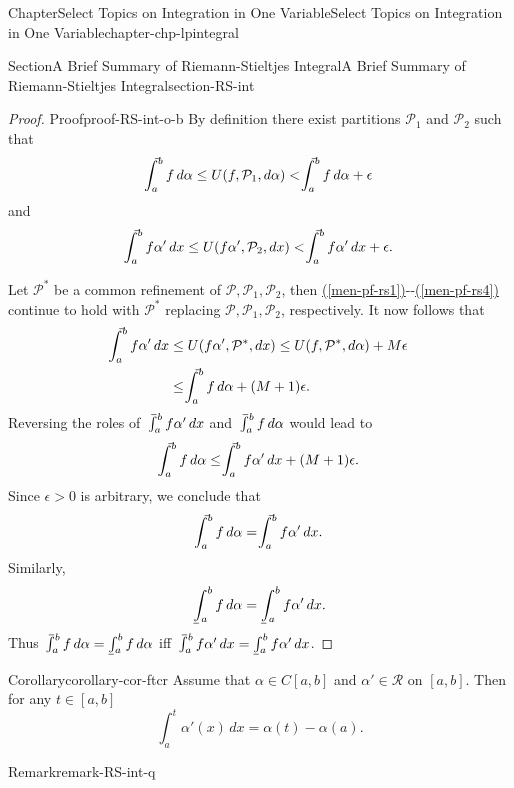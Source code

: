 \documentclass[oneside,10pt,]{book}
\makeatletter
\newcommand{\xreffont}{\relax}
\numberwithin{equation}{section}
\newcommand{\cP}{\mathcal{P}}
\newcommand{\cR}{\mathcal{R}}
\def\upint{\mathchoice
    {\mkern10mu\overline{\vphantom{\intop}\mkern7mu}\mkern-24mu}
    {\mkern7mu\overline{\vphantom{\intop}\mkern7mu}\mkern-14mu}
    {\mkern7mu\overline{\vphantom{\intop}\mkern7mu}\mkern-14mu}
    {\mkern7mu\overline{\vphantom{\intop}\mkern7mu}\mkern-14mu}
  \int}
\def\lowint{\relax\if@display
 \mkern3mu\underline{\vphantom{\intop}\mkern7mu}\mkern-10mu\int
\else 
\underline{\vphantom{\int}\mkern7mu}\mkern-10mu\int
\fi}
\newcommand{\amp}{&}
\makeatother
\begin{document}
\begin{chapterptx}{Chapter}{Select Topics on Integration in One Variable}{}{Select Topics on Integration in One Variable}{}{}{chapter-chp-lpintegral}
\begin{sectionptx}{Section}{A Brief Summary of Riemann-Stieltjes Integral}{}{A Brief Summary of Riemann-Stieltjes Integral}{}{}{section-RS-int}
\begin{proof}{Proof}{}{proof-RS-int-o-b}
By definition there exist partitions \(\cP_{1}\) and \(\cP_{2}\) such that%
\begin{equation}
\upint_{a}^{b} f \, d\alpha \le U(f, \cP_{1}, d\alpha) < \upint_{a}^{b} f \, d\alpha + \epsilon\label{men-pf-rs3}
\end{equation}
and%
\begin{equation}
\upint_{a}^{b} f \alpha' \, dx \le U(f \alpha', \cP_{2}, dx) <  \upint_{a}^{b} f \alpha' \, dx + \epsilon.\label{men-pf-rs4}
\end{equation}
%
\par
Let \(\cP^{*}\) be a common refinement of \(\cP, \cP_{1}, \cP_{2}\), then \hyperref[men-pf-rs1]{({\xreffont\ref{men-pf-rs1}})}-{}-{}\hyperref[men-pf-rs4]{({\xreffont\ref{men-pf-rs4}})} continue to hold with \(\cP^{*}\) replacing \(\cP, \cP_{1}, \cP_{2}\), respectively.  It now follows that%
\begin{align*}
\upint_{a}^{b} f \alpha' \, dx \amp \le U(f \alpha', \cP^{*}, dx)\le U(f, \cP^{*}, d\alpha)+M\epsilon\\
\amp \le \upint_{a}^{b} f\, d\alpha + (M+1)\epsilon.
\end{align*}
Reversing the roles of \(\upint_{a}^{b} f \alpha' \, dx\) and \(\upint_{a}^{b} f\, d\alpha \) would lead to%
\begin{equation*}
\upint_{a}^{b} f\, d\alpha  \le \upint_{a}^{b} f \alpha' \, dx +(M+1)\epsilon.
\end{equation*}
Since \(\epsilon > 0\) is arbitrary, we conclude that%
\begin{equation}
\upint_{a}^{b} f\, d\alpha  = \upint_{a}^{b} f \alpha' \, dx.\label{men-pf-rs5}
\end{equation}
Similarly,%
\begin{equation}
\lowint_{a}^{b} f\, d\alpha  = \lowint_{a}^{b} f \alpha' \, dx.\label{men-pf-rs6}
\end{equation}
Thus \(\upint_{a}^{b} f\, d\alpha=\lowint_{a}^{b} f\, d\alpha\) iff \(\upint_{a}^{b} f \alpha' \, dx= \lowint_{a}^{b} f \alpha' \, dx\).%
\end{proof}
\begin{corollary}{Corollary}{}{}{corollary-cor-ftcr}%
Assume that \(\alpha \in C[a, b]\) and \(\alpha' \in \cR\) on \([a, b]\). Then for any \(t\in [a, b]\)%
\begin{equation}
\int_{a}^{t} \alpha'(x)\, dx = \alpha(t)-\alpha(a).\label{men-eq-ftcr}
\end{equation}
\end{corollary}
\begin{remark}{Remark}{}{remark-RS-int-q}%

\end{remark}
\end{sectionptx}
\end{chapterptx}
\end{document}
